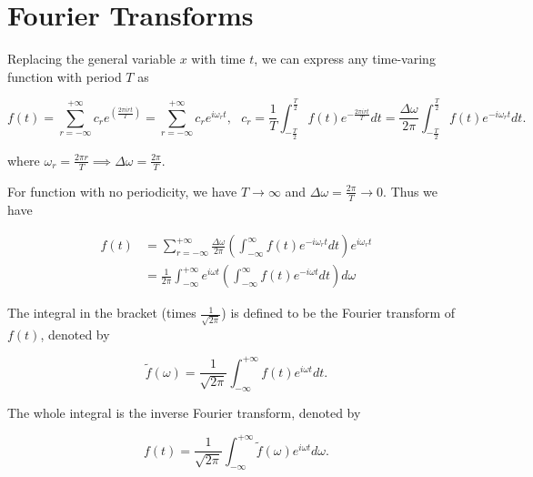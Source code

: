 \documentclass[english,a4paper,12pt]{report}
\begin{document}
\section{Fourier Transforms}

Replacing the general variable \(x\) with time \(t\), we can express any time-varing function with period \(T\) as 

\begin{equation}
    f(t) = \sum_{r=-\infty}^{+\infty} c_{r} e^{\left( \frac{2\pi irt}{T}  \right)} = \sum_{r=-\infty}^{+\infty} c_{r} e^{i\omega _{r} t }, ~~~ c_{r} = \frac{1}{T} \int_{-\frac{T}{2} }^{\frac{T}{2} } f(t) e^{-\frac{2\pi irt}{T} }dt = \frac{\Delta \omega }{2\pi } \int_{-\frac{T}{2} }^{\frac{T}{2} } f(t) e^{-i \omega _{r} t} dt    .         
\end{equation}

where \(\omega _{r} = \frac{2\pi r}{T} \implies \Delta \omega = \frac{2\pi }{T} \). 

For function with no periodicity, we have \(T \to \infty\) and \(\Delta \omega = \frac{2\pi }{T} \to 0 \). Thus we have

\begin{equation}
    \begin{aligned} 
    f(t) &= \sum_{r=-\infty}^{+\infty} \frac{\Delta \omega }{2\pi } \left( \int_{-\infty}^{\infty } f(t) e^{- i \omega _{r} t} dt \right) e^{i \omega _{r} t} \\
    &= \frac{1}{2\pi } \int_{-\infty}^{+\infty} e^{i \omega t}  \left( \int_{-\infty}^{\infty } f(t) e^{- i \omega t} dt \right) d \omega 
    \end{aligned} 
\end{equation}

The integral in the bracket (times \(\frac{1}{\sqrt{2\pi } } \)) is defined to be the Fourier transform of \(f(t)\), denoted by 

\begin{equation}
    \tilde{f}(\omega ) = \frac{1}{\sqrt{2\pi } } \int_{-\infty}^{+\infty} f(t) e^{i \omega t}dt.     
\end{equation}

The whole integral is the inverse Fourier transform, denoted by 

\begin{equation}
    f(t) = \frac{1}{\sqrt{2\pi } } \int_{-\infty}^{+\infty} \tilde{f}(\omega )e^{i \omega t} d \omega .     
\end{equation}
\end{document}
